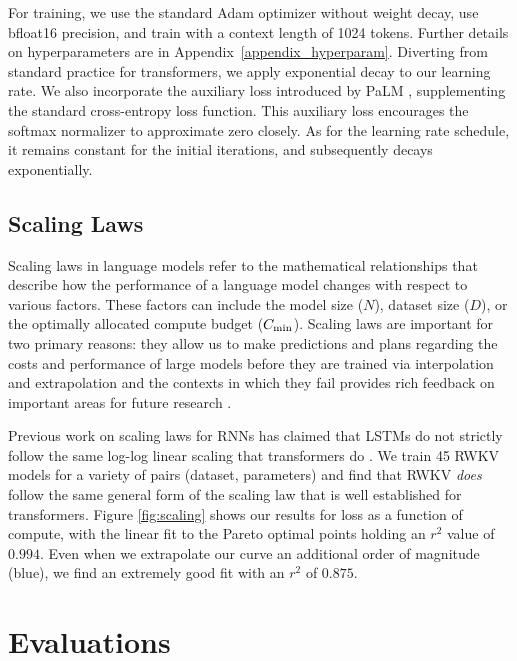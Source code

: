 For training, we use the standard Adam optimizer without weight decay, use bfloat16 precision, and train with a context length of 1024 tokens. Further details on hyperparameters are in Appendix~\ref{appendix_hyperparam}. Diverting from standard practice for transformers, we apply exponential decay to our learning rate. We also incorporate the auxiliary loss introduced by PaLM \cite{PaLM}, supplementing the standard cross-entropy loss function. This auxiliary loss encourages the softmax normalizer to approximate zero closely. As for the learning rate schedule, it remains constant for the initial iterations, and subsequently decays exponentially. 

\subsection{Scaling Laws}

Scaling laws \cite{kaplan2020scaling,henighan2020scaling,hoffmann2022training,muennighoff2023scaling} in language models refer to the mathematical relationships that describe how the performance of a language model changes with respect to various factors. These factors can include the model size ($N$), dataset size ($D$), or the optimally allocated compute budget ($C_{\rm min}$). Scaling laws are important for two primary reasons: they allow us to make predictions and plans regarding the costs and performance of large models before they are trained via interpolation and extrapolation \cite{black2022gpta,le2022language} and the contexts in which they fail provides rich feedback on important areas for future research \cite{Wei2022EmergentAO,biderman2023emergent}.

Previous work on scaling laws for RNNs has claimed that LSTMs do not strictly follow the same log-log linear scaling that transformers do \cite{kaplan2020scaling}. We train 45 RWKV models for a variety of pairs (dataset, parameters) and find that RWKV \textit{does} follow the same general form of the scaling law that is well established for transformers. Figure \ref{fig:scaling} shows our results for loss as a function of compute, with the linear fit to the Pareto optimal points holding an $r^2$ value of $0.994$. Even when we extrapolate our curve an additional order of magnitude (blue), we find an extremely good fit with an $r^2$ of $0.875$.

\section{Evaluations}\label{evaluations}


